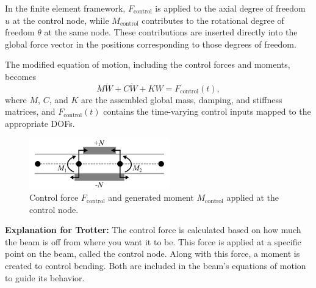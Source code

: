 \documentclass{article}
\begin{document}
	In the finite element framework, \( F_{\text{control}} \) is applied to the axial degree of freedom \( u \) at the control node, while \( M_{\text{control}} \) contributes to the rotational degree of freedom \( \theta \) at the same node. These contributions are inserted directly into the global force vector in the positions corresponding to those degrees of freedom.
	
	The modified equation of motion, including the control forces and moments, becomes
	\begin{equation}
		M \ddot{W} + C \dot{W} + K W = F_{\text{control}}(t),
	\end{equation}
	where \( M \), \( C \), and \( K \) are the assembled global mass, damping, and stiffness matrices, and \( F_{\text{control}}(t) \) contains the time-varying control inputs mapped to the appropriate DOFs.
	
	\begin{figure}[H]
		\centering
		\includegraphics[width=2.4in]{Figures/ControlForces_Figure.png}
		\caption{Control force \( F_{\text{control}} \) and generated moment \( M_{\text{control}} \) applied at the control node.}
		\label{fig:control_forces}
	\end{figure}
	
	\textbf{Explanation for Trotter:} The control force is calculated based on how much the beam is off from where you want it to be. This force is applied at a specific point on the beam, called the control node. Along with this force, a moment is created to control bending. Both are included in the beam’s equations of motion to guide its behavior.
	
\end{document}
